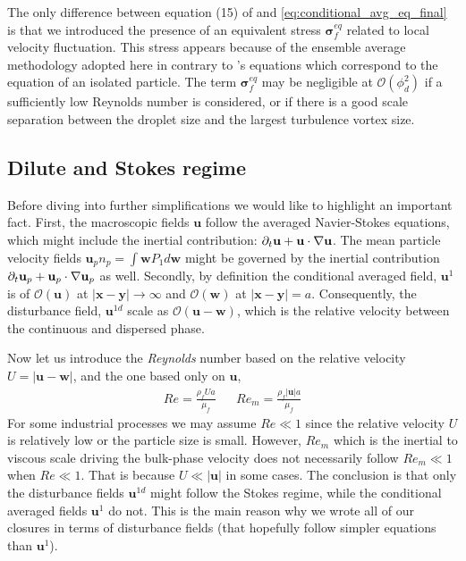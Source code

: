 The only difference between equation (15) of \citep{maxey1983equation} and \ref{eq:conditional_avg_eq_final} is that we introduced the presence of an equivalent stress $\bm\sigma_f^{eq}$ related to local velocity fluctuation. 
This stress appears because of the ensemble average methodology adopted here in contrary to \citep{maxey1983equation}'s equations which correspond to the equation of an isolated particle. 
The term $\bm\sigma_f^{eq}$ may be negligible at $\mathcal{O}(\phi_d^2)$ if a sufficiently low Reynolds number is considered, or if there is a good scale separation between the droplet size and the largest turbulence vortex size. 




\subsection{Dilute and Stokes regime}

Before diving into further simplifications we would like to highlight an important fact. 
First, the macroscopic fields $\textbf{u}$ follow the averaged Navier-Stokes equations, which might include the inertial contribution: $\partial_t \textbf{u} + \textbf{u}\cdot \mathbf{\nabla} \textbf{u}$. 
The mean particle velocity fields $\textbf{u}_p n_p= \int \textbf{w} P_1d\textbf{w}$ might be governed by the inertial contribution $\partial_t \textbf{u}_p + \textbf{u}_p\cdot \mathbf{\nabla} \textbf{u}_p$ as well.   
Secondly, by definition the conditional averaged field, $\textbf{u}^{1}$ is of $\mathcal{O}(\textbf{u})$ at $|\textbf{x}- \textbf{y}|\to \infty$ and $\mathcal{O}(\textbf{w})$ at $|\textbf{x} - \textbf{y}|= a$. 
Consequently, the disturbance field, $\textbf{u}^{1d}$ scale as $\mathcal{O}(\textbf{u} - \textbf{w})$, which is the relative velocity between the continuous and dispersed phase. 

Now let us introduce the \textit{Reynolds} number based on the relative velocity $U =|\textbf{u}- \textbf{w}|$, and the one based only on $\textbf{u}$, 
\begin{align}
    Re = \frac{\rho_f U a}{\mu_f} && 
    Re_m = \frac{\rho_f |\textbf{u}| a}{\mu_f} 
\end{align} 
For some industrial processes we may assume $Re \ll 1$ since the relative velocity $U$ is relatively low or the particle size is small. 
However, $Re_m$ which is the inertial to viscous scale driving the bulk-phase velocity does not necessarily follow $Re_m \ll 1$ when $Re \ll 1$.  
That is because  $U \ll |\textbf{u}|$ in some cases. 
The conclusion is that only the disturbance fields $\textbf{u}^{1d}$ might follow the Stokes regime, while the conditional averaged fields $\textbf{u}^1$ do not. 
This is the main reason why we wrote all of our closures in terms of disturbance fields (that hopefully follow simpler equations than $\textbf{u}^1$). 

